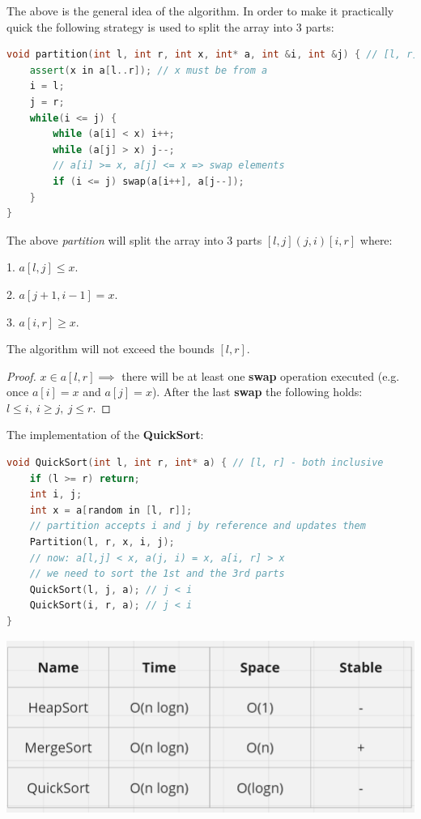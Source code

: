The above is the general idea of the algorithm. In order to make it practically quick the following strategy is used to split the array into 3 parts:

\begin{lstlisting}[language=C++]
void partition(int l, int r, int x, int* a, int &i, int &j) { // [l, r] - both inclusive
    assert(x in a[l..r]); // x must be from a
    i = l;
    j = r;
    while(i <= j) {
        while (a[i] < x) i++;
        while (a[j] > x) j--;
        // a[i] >= x, a[j] <= x => swap elements
        if (i <= j) swap(a[i++], a[j--]);
    }
}
\end{lstlisting}

The above \textit{partition} will split the array into 3 parts $[l, j](j, i)[i, r]$ where:

1. $a[l, j] \leq x$.

2. $a[j+1, i-1] = x$.

3. $a[i, r] \geq x$.

\begin{lemma}
    The algorithm will not exceed the bounds $[l, r]$.
\end{lemma}

\begin{proof}
    $x \in a[l, r] \implies$ there will be at least one \textbf{swap} operation executed (e.g. once $a[i] = x$ and $a[j] = x$). After the last \textbf{swap} the following holds: $l \leq i,\ i \geq j,\ j \leq r$.
\end{proof}

The implementation of the \textbf{QuickSort}:

\begin{lstlisting}[language=C++]
void QuickSort(int l, int r, int* a) { // [l, r] - both inclusive
    if (l >= r) return;
    int i, j;
    int x = a[random in [l, r]];
    // partition accepts i and j by reference and updates them
    Partition(l, r, x, i, j);
    // now: a[l,j] < x, a(j, i) = x, a[i, r] > x
    // we need to sort the 1st and the 3rd parts
    QuickSort(l, j, a); // j < i
    QuickSort(i, r, a); // j < i
}
\end{lstlisting}


\begin{center}
    \includegraphics[scale=0.6]{./assets/13-sorting-algorithms/2.PNG}
\end{center}

